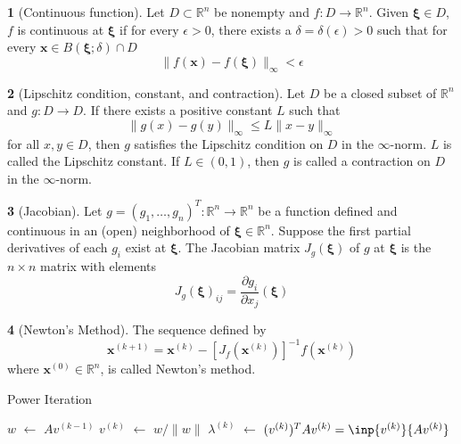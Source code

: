 \documentclass[12pt]{article}
\theoremstyle{definition}
\newtheorem{definition}{\color{NavyBlue}{\textbf{Definition}}}
\newcommand{\e}{\epsilon}
\newcommand{\R}{\mathbb{R}}
\newcommand{\norm}[1]{\lVert#1\rVert}
\newcommand{\x}{\bm{x}}
\newcommand{\xib}{\bm{\xi}}
\newcommand*\Let[2]{\State #1 $\gets$ #2}
\begin{document}
\begin{definition}[Continuous function]
Let $D \subset \R^n$ be nonempty and $f: D \to \R^n$. Given $\xib \in D$, $f$ is continuous at $\xib$ if for every $\e > 0$, there exists a $\delta = \delta(\e) > 0$ such that for every $\x \in B(\xib; \delta) \cap D$
\begin{equation}
  \norm{f(\x) - f(\xib)}_\infty < \e
 \end{equation}
\end{definition}

\begin{definition}[Lipschitz condition, constant, and contraction]
Let $D$ be a closed subset of $\R^n$ and $g: D \to D$. If there exists a positive constant $L$ such that
\begin{equation}
\norm{g(x) - g(y)}_\infty \leq L \norm{x - y}_\infty
\end{equation}
for all $x, y \in D$, then $g$ satisfies the Lipschitz condition on $D$ in the $\infty$-norm. $L$ is called the Lipschitz constant. If $L \in (0,1)$, then $g$ is called a contraction on $D$ in the $\infty$-norm.
\end{definition}

\begin{definition}[Jacobian]
Let $g = (g_1, \ldots, g_n)^T : \R^n \to \R^n$ be a function defined and continuous in an (open) neighborhood of $\xib \in \R^n$. Suppose the first partial derivatives of each $g_i$ exist at $\xib$. The Jacobian matrix $J_g(\xib)$ of $g$ at $\xib$ is the $n \times n$ matrix with elements
\begin{equation}
J_g(\xib)_{ij} = \frac{\partial g_i}{\partial x_j} (\xib)
\end{equation}
\end{definition}

\begin{definition}[Newton's Method]
The sequence defined by
\begin{equation}
\x^{(k+1)} = \x^{(k)} - [J_f(\x^{(k)})]^{-1} f(\x^{(k)})
\end{equation}
where $\x^{(0)} \in \R^n$, is called Newton's method.
\end{definition}

\begin{algorithm}[ht]
  \caption{Power Iteration}
  \begin{algorithmic}[1]
    \Require{$v^{(0)} =$ some vector with $\norm{v^{(0)}} = 1$}
    \Let{$w$}{$Av^{(k-1)}$} 
    \Let{$v^{(k)}$}{$w/ \norm{w}$} 
    \Let{$\lambda^{(k)}$}{$(v^{(k)})^T Av^{(k)} = \inp{v^{(k)}}{Av^{(k)}}$} 
    \EndFor
  \end{algorithmic}
\end{algorithm}
\end{document}
